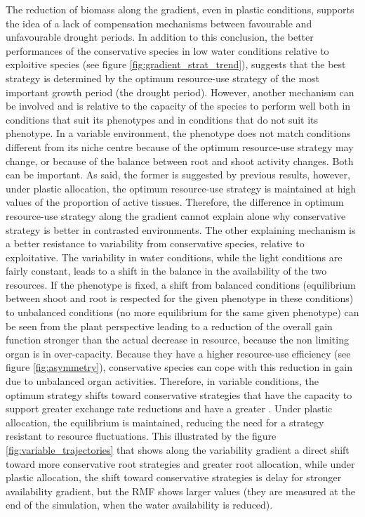 The reduction of biomass along the gradient, even in plastic conditions, supports the idea of a lack of compensation mechanisms between favourable and unfavourable drought periods. In addition to this conclusion, the better performances of the conservative species in low water conditions relative to exploitive species (see figure \ref{fig:gradient_strat_trend}), suggests that the best strategy is determined by the optimum resource-use strategy of the most important growth period (the drought period). However, another mechanism can be involved and is relative to the capacity of the species to perform well both in conditions that suit its phenotypes and in conditions that do not suit its phenotype. In a variable environment, the phenotype does not match conditions different from its niche centre because of the optimum resource-use strategy may change, or because of the balance between root and shoot activity changes. Both can be important. As said, the former is suggested by previous results, however, under plastic allocation, the optimum resource-use strategy is maintained at high values of the proportion of active tissues. Therefore, the difference in optimum resource-use strategy along the gradient cannot explain alone why conservative strategy is better in contrasted environments. The other explaining mechanism is a better resistance to variability from conservative species, relative to exploitative. The variability in water conditions, while the light conditions are fairly constant, leads to a shift in the balance in the availability of the two resources. If the phenotype is fixed, a shift from balanced conditions (equilibrium between shoot and root is respected for the given phenotype in these conditions) to unbalanced conditions (no more equilibrium for the same given phenotype) can be seen from the plant perspective leading to a reduction of the overall gain function stronger than the actual decrease in resource, because the non limiting organ is in over-capacity. Because they have a higher resource-use efficiency (see figure \ref{fig:asymmetry}), conservative species can cope with this reduction in gain due to unbalanced organ activities. Therefore, in variable conditions, the optimum strategy shifts toward conservative strategies that have the capacity to support greater exchange rate reductions and have a greater . Under plastic allocation, the equilibrium is maintained, reducing the need for a strategy resistant to resource fluctuations. This illustrated by the figure \ref{fig:variable_trajectories} that shows along the variability gradient a direct shift toward more conservative root strategies and greater root allocation, while under plastic allocation, the shift toward conservative strategies is delay for stronger availability gradient, but the RMF shows larger values (they are measured at the end of the simulation, when the water availability is reduced).

